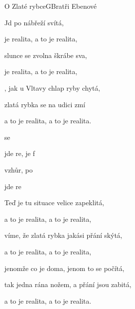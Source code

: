 \setcounter{page}{63}
\begin{song}{O Zlaté rybce}{G}{Bratři Ebenové}

\begin{SBVerse}

Jd po nábřeží   svítá,

 je realita, a to je realita,

slunce se zvolna škrábe  sva,

 je realita, a to je realita,

, jak u Vltavy  chlap ryby chytá,

 zlatá rybka se na udici zmí

a to je realita, a to je realita.

\end{SBVerse}

\begin{SBChorus}

 se   

 jde re,  je  f

 vzhůr,  po 

 jde re    

\end{SBChorus}

\begin{SBVerse}

Teď je tu situace velice zapeklitá,

a to je realita, a to je realita,

víme, že zlatá rybka jakási přání skýtá,

a to je realita, a to je realita,

jenomže co je doma, jenom to se počítá,

tak jedna rána nožem, a přání jsou zabitá,

a to je realita, a to je realita.

\end{SBVerse}

\begin{SBChorus}

\end{SBChorus}


\end{song}
